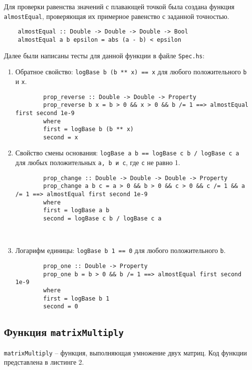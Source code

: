 \documentclass[10pt,a4paper,final]{article} %
\begin{document}
Для проверки равенства значений с плавающей точкой была создана функция  \texttt{almostEqual}, проверяющая их примерное равенство с заданной точностью.
\begin{lstlisting}
	almostEqual :: Double -> Double -> Double -> Bool
	almostEqual a b epsilon = abs (a - b) < epsilon
\end{lstlisting}

Далее были написаны тесты для данной функции в файле \texttt{Spec.hs}:

\begin{enumerate}
	\item Обратное свойство: \texttt{logBase b (b ** x) == х} для любого положительного \texttt{b} и \texttt{х}.
	
	\begin{lstlisting}
		prop_reverse :: Double -> Double -> Property
		prop_reverse b x = b > 0 && x > 0 && b /= 1 ==> almostEqual first second 1e-9
		where 
		first = logBase b (b ** x)
		second = x
	\end{lstlisting}
	
	\item Свойство смены основания: \texttt{logBase a b == logBase c b / logBase с а} для любых положительных \texttt{а, b и с}, где \texttt{с} не равно 1.
	
	\begin{lstlisting}
		prop_change :: Double -> Double -> Double -> Property
		prop_change a b c = a > 0 && b > 0 && c > 0 && c /= 1 && a /= 1 ==> almostEqual first second 1e-9
		where 
		first = logBase a b
		second = logBase c b / logBase c a
	\end{lstlisting}
	﻿﻿﻿
	\item Логарифм единицы: \texttt{logBase b 1 == 0} для любого положительного \texttt{b}.
	
	\begin{lstlisting}
		prop_one :: Double -> Property
		prop_one b = b > 0 && b /= 1 ==> almostEqual first second 1e-9
		where 
		first = logBase b 1
		second = 0
	\end{lstlisting}
\end{enumerate}


\subsection{Функция \texttt{matrixMultiply}}

\texttt{matrixMultiply} -- функция, выполняющая умножение двух матриц. Код функции представлена в листинге 2.
\end{document}
